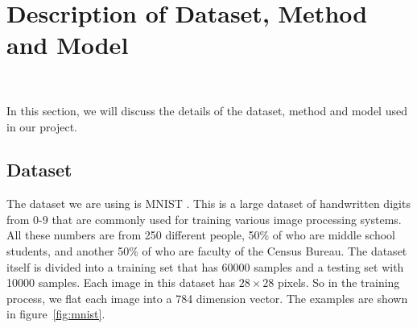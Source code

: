 \documentclass[twoside,twocolumn]{article}
\begin{document}

\section{Description of Dataset, Method and Model}~\label{sec:des}



In this section, we will discuss the details of the dataset, method and model used in our project.

\subsection{Dataset}

The dataset we are using is MNIST \cite{lecun1998mnist}. This is a large dataset of handwritten digits from 0-9 that are commonly used for training various image processing systems. All these numbers are from 250 different people, 50\% of who are middle school students, and another 50\% of who are faculty of the Census Bureau. The dataset itself is divided into a training set that has 60000 samples and a testing set with 10000 samples. Each image in this dataset has $28 \times 28$ pixels. So in the training process, we flat each image into a 784 dimension vector. The examples are shown in figure~\ref{fig:mnist}.
\end{document}
